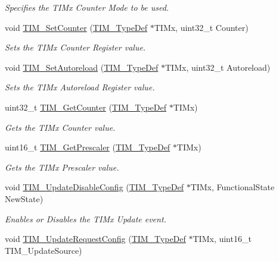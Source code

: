 \begin{DoxyCompactItemize}
\begin{DoxyCompactList}\small\item\em Specifies the T\+I\+Mx Counter Mode to be used. \end{DoxyCompactList}\item 
void \hyperlink{group___t_i_m_ga18173e7955a85d5c2598c643eada2692}{T\+I\+M\+\_\+\+Set\+Counter} (\hyperlink{struct_t_i_m___type_def}{T\+I\+M\+\_\+\+Type\+Def} $\ast$T\+I\+Mx, uint32\+\_\+t Counter)
\begin{DoxyCompactList}\small\item\em Sets the T\+I\+Mx Counter Register value. \end{DoxyCompactList}\item 
void \hyperlink{group___t_i_m_gad6a388d498c7f299d00a9d0871943041}{T\+I\+M\+\_\+\+Set\+Autoreload} (\hyperlink{struct_t_i_m___type_def}{T\+I\+M\+\_\+\+Type\+Def} $\ast$T\+I\+Mx, uint32\+\_\+t Autoreload)
\begin{DoxyCompactList}\small\item\em Sets the T\+I\+Mx Autoreload Register value. \end{DoxyCompactList}\item 
uint32\+\_\+t \hyperlink{group___t_i_m_ga53607976e0866ab424e294cda9f6036e}{T\+I\+M\+\_\+\+Get\+Counter} (\hyperlink{struct_t_i_m___type_def}{T\+I\+M\+\_\+\+Type\+Def} $\ast$T\+I\+Mx)
\begin{DoxyCompactList}\small\item\em Gets the T\+I\+Mx Counter value. \end{DoxyCompactList}\item 
uint16\+\_\+t \hyperlink{group___t_i_m_ga427eb6e533480e02a27cd0ca876183d6}{T\+I\+M\+\_\+\+Get\+Prescaler} (\hyperlink{struct_t_i_m___type_def}{T\+I\+M\+\_\+\+Type\+Def} $\ast$T\+I\+Mx)
\begin{DoxyCompactList}\small\item\em Gets the T\+I\+Mx Prescaler value. \end{DoxyCompactList}\item 
void \hyperlink{group___t_i_m_gace2384dd33e849a054f61b8e1fc7e7c3}{T\+I\+M\+\_\+\+Update\+Disable\+Config} (\hyperlink{struct_t_i_m___type_def}{T\+I\+M\+\_\+\+Type\+Def} $\ast$T\+I\+Mx, Functional\+State New\+State)
\begin{DoxyCompactList}\small\item\em Enables or Disables the T\+I\+Mx Update event. \end{DoxyCompactList}\item 
void \hyperlink{group___t_i_m_ga1d7a8f952e209de142499e67a653fc1f}{T\+I\+M\+\_\+\+Update\+Request\+Config} (\hyperlink{struct_t_i_m___type_def}{T\+I\+M\+\_\+\+Type\+Def} $\ast$T\+I\+Mx, uint16\+\_\+t T\+I\+M\+\_\+\+Update\+Source)

\end{DoxyCompactItemize}
